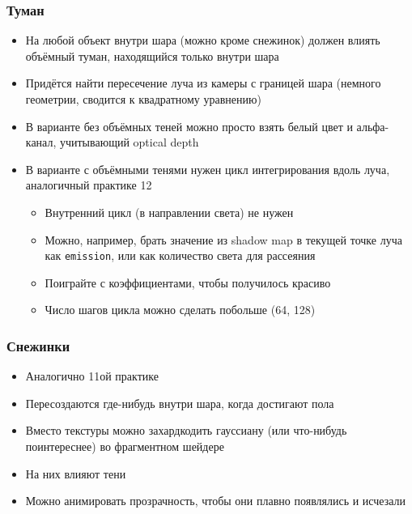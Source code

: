 \documentclass{beamer}
\begin{document}
\begin{frame}[fragile]
\frametitle{Туман}
\begin{itemize}
\item На любой объект внутри шара (можно кроме снежинок) должен влиять объёмный туман, находящийся только внутри шара
\item Придётся найти пересечение луча из камеры с границей шара (немного геометрии, сводится к квадратному уравнению)
\item В варианте без объёмных теней можно просто взять белый цвет и альфа-канал, учитывающий optical depth
\item В варианте с объёмными тенями нужен цикл интегрирования вдоль луча, аналогичный практике 12
\begin{itemize}
\item Внутренний цикл (в направлении света) не нужен
\item Можно, например, брать значение из shadow map в текущей точке луча как \verb|emission|, или как количество света для рассеяния
\item Поиграйте с коэффициентами, чтобы получилось красиво
\item Число шагов цикла можно сделать побольше (64, 128)
\end{itemize}
\end{itemize}
\end{frame}

\begin{frame}[fragile]
\frametitle{Снежинки}
\begin{itemize}
\item Аналогично 11ой практике
\item Пересоздаются где-нибудь внутри шара, когда достигают пола
\item Вместо текстуры можно захардкодить гауссиану (или что-нибудь поинтереснее) во фрагментном шейдере
\item На них влияют тени
\item Можно анимировать прозрачность, чтобы они плавно появлялись и исчезали
\end{itemize}
\end{frame}
\end{document}
